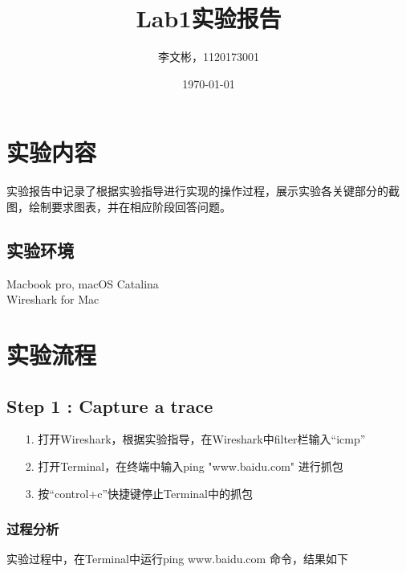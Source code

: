 \documentclass{article}
\title{Lab1实验报告}
\author{李文彬，1120173001}
\date{\today}
\begin{document}
	\maketitle
	\section{实验内容}
实验报告中记录了根据实验指导进行实现的操作过程，展示实验各关键部分的截图，绘制要求图表，并在相应阶段回答问题。
\subsection{实验环境}
Macbook pro, macOS Catalina\\Wireshark for Mac

\section{实验流程}
\subsection{Step 1 : Capture a trace}
   \begin{itemize}
\item[1.]打开Wireshark，根据实验指导，在Wireshark中filter栏输入“icmp”
\item[2.]打开Terminal，在终端中输入ping "www.baidu.com" 进行抓包
\item[3.]按“control+c”快捷键停止Terminal中的抓包
   \end{itemize}
   	\subsubsection{过程分析}
   实验过程中，在Terminal中运行ping www.baidu.com 命令，结果如下
   
%
%
%
%
%
%
%
    
\end{document}
